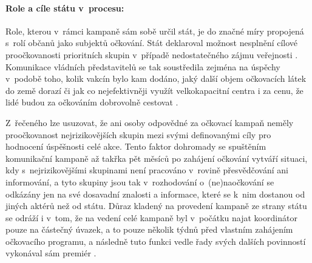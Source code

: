 \paragraph{Role a cíle státu v~procesu:} Role, kterou v~rámci kampaně sám sobě určil stát, je do značné míry propojená s~rolí občanů jako subjektů očkování. Stát deklaroval možnost nesplnění cílové proočkovanosti prioritních skupin v~případě nedostatečného zájmu veřejnosti \cite{kdoprvni}. Komunikace vládních představitelů se tak soustředila zejména na úspěchy v~podobě toho, kolik vakcín bylo kam dodáno, jaký další objem očkovacích látek do země dorazí či jak co nejefektivněji využít velkokapacitní centra i za cenu, že lidé budou za očkováním dobrovolně cestovat \cite{babis_echo}.

Z~řečeného lze usuzovat, že ani osoby odpovědné za očkovací kampaň neměly proočkovanost nejrizikovějších skupin mezi svými definovanými cíly pro hodnocení úspěšnosti celé akce. Tento faktor dohromady 
se spuštěním komunikační kampaně až takřka pět měsíců po zahájení očkování \cite{logoc_naruby,logoc_zpozdeni} vytváří situaci, kdy s~nejrizikovějšími skupinami není pracováno v~rovině přesvědčování ani informování, a tyto skupiny jsou tak v~rozhodování o~(ne)naočkování se odkázány jen na své dosavadní znalosti a informace, které se k~nim dostanou od jiných aktérů než od státu. Důraz kladený na provedení kampaně ze strany státu se odráží i v~tom, že na vedení celé kampaně byl v~počátku najat koordinátor pouze na částečný úvazek, a to pouze několik týdnů před vlastním zahájením očkovacího programu, a následně tuto funkci vedle řady svých dalších povinností vykonával sám premiér \cite{ocko_blahuta,babis_koordinator}. %










